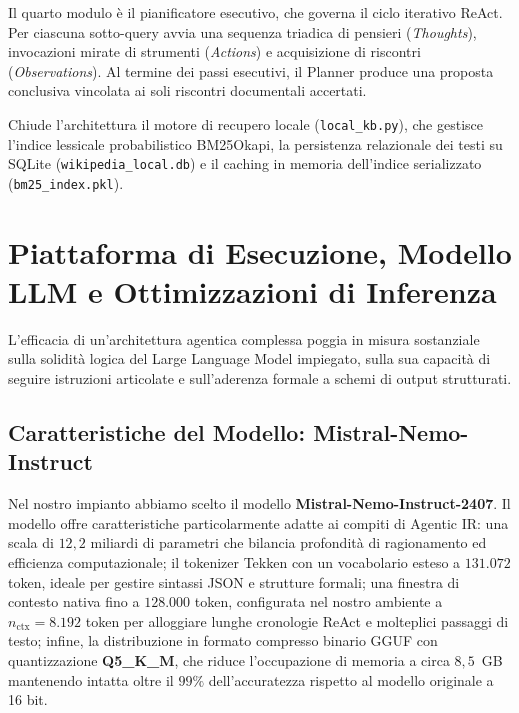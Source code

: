 Il quarto modulo è il pianificatore esecutivo, che governa il ciclo iterativo ReAct. Per ciascuna sotto-query avvia una sequenza triadica di pensieri (\textit{Thoughts}), invocazioni mirate di strumenti (\textit{Actions}) e acquisizione di riscontri (\textit{Observations}). Al termine dei passi esecutivi, il Planner produce una proposta conclusiva vincolata ai soli riscontri documentali accertati.

Chiude l'architettura il motore di recupero locale (\texttt{local\_kb.py}), che gestisce l'indice lessicale probabilistico BM25Okapi, la persistenza relazionale dei testi su SQLite (\texttt{wikipedia\_local.db}) e il caching in memoria dell'indice serializzato (\texttt{bm25\_index.pkl}).

\section{Piattaforma di Esecuzione, Modello LLM e Ottimizzazioni di Inferenza}
\label{sec:piattaforma_llm}

L'efficacia di un'architettura agentica complessa poggia in misura sostanziale sulla solidità logica del Large Language Model impiegato, sulla sua capacità di seguire istruzioni articolate e sull'aderenza formale a schemi di output strutturati.

\subsection{Caratteristiche del Modello: Mistral-Nemo-Instruct}
Nel nostro impianto abbiamo scelto il modello \textbf{Mistral-Nemo-Instruct-2407}. Il modello offre caratteristiche particolarmente adatte ai compiti di Agentic IR: una scala di $12,2$ miliardi di parametri che bilancia profondità di ragionamento ed efficienza computazionale; il tokenizer Tekken con un vocabolario esteso a $131.072$ token, ideale per gestire sintassi JSON e strutture formali; una finestra di contesto nativa fino a $128.000$ token, configurata nel nostro ambiente a $n_{\text{ctx}} = 8.192$ token per alloggiare lunghe cronologie ReAct e molteplici passaggi di testo; infine, la distribuzione in formato compresso binario GGUF con quantizzazione \textbf{Q5\_K\_M}, che riduce l'occupazione di memoria a circa $8,5$~GB mantenendo intatta oltre il $99\%$ dell'accuratezza rispetto al modello originale a 16 bit.

